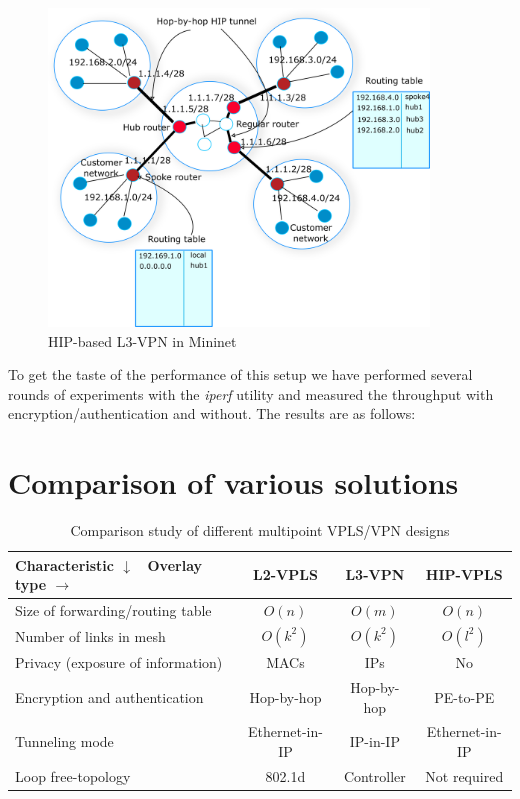 \begin{figure}[!ht]
    \centering
    \includegraphics[width=0.9\textwidth]{graphics/l3-vpn.png}
    \caption{HIP-based L3-VPN in Mininet}
    \label{fig:l3vpn}
\end{figure}

To get the taste of the performance of this setup we have performed 
several rounds of experiments with the {\it iperf} utility and measured
the throughput with encryption/authentication and without. The results 
are as follows:

\section{Comparison of various solutions}

\begin{table}
    \small
    \begin{tabular}{|l|c|c|c|}
    \hline
    Characteristic $\downarrow$ \ Overlay type $\rightarrow$ & L2-VPLS & L3-VPN & HIP-VPLS \\\hline
    Size of forwarding/routing table & $O(n)$ & $O(m)$ & $O(n)$\\\hline
    Number of links in mesh & $O(k^2)$ & $O(k^2)$ & $O(l^2)$ \\\hline
    Privacy (exposure of information) & MACs & IPs & No \\\hline
    Encryption and authentication & Hop-by-hop & Hop-by-hop & PE-to-PE \\\hline
    Tunneling mode & Ethernet-in-IP & IP-in-IP & Ethernet-in-IP \\\hline
    Loop free-topology & 802.1d & Controller & Not required \\\hline
    \end{tabular}
    \label{analysis}
    \caption {Comparison study of different multipoint VPLS/VPN designs}
\end{table}

